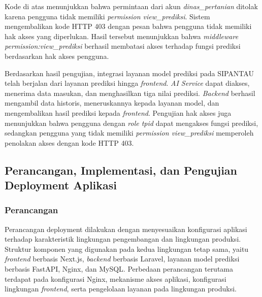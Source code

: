 \begin{code}
\end{code}

Kode di atas menunjukkan bahwa permintaan dari akun \textit{dinas\_pertanian} ditolak karena pengguna tidak memiliki \textit{permission view\_prediksi}. Sistem mengembalikan kode HTTP 403 dengan pesan bahwa pengguna tidak memiliki hak akses yang diperlukan. Hasil tersebut menunjukkan bahwa \textit{middleware permission:\allowbreak view\allowbreak \_prediksi} berhasil membatasi akses terhadap fungsi prediksi berdasarkan hak akses pengguna.

Berdasarkan hasil pengujian, integrasi layanan model prediksi pada SIPANTAU telah berjalan dari layanan prediksi hingga \textit{frontend}. \textit{AI Service} dapat diakses, menerima data masukan, dan menghasilkan tiga nilai prediksi. \textit{Backend} berhasil mengambil data historis, meneruskannya kepada layanan model, dan mengembalikan hasil prediksi kepada \textit{frontend}. Pengujian hak akses juga menunjukkan bahwa pengguna dengan \textit{role tpid} dapat mengakses fungsi prediksi, sedangkan pengguna yang tidak memiliki \textit{permission view\_prediksi} memperoleh penolakan akses dengan kode HTTP 403.

\subsection{Perancangan, Implementasi, dan Pengujian Deployment Aplikasi}

\subsubsection{Perancangan}

Perancangan deployment dilakukan dengan menyesuaikan konfigurasi aplikasi terhadap karakteristik lingkungan pengembangan dan lingkungan produksi. Struktur komponen yang digunakan pada kedua lingkungan tetap sama, yaitu \textit{frontend} berbasis Next.js, \textit{backend} berbasis Laravel, layanan model prediksi berbasis FastAPI, Nginx, dan MySQL. Perbedaan perancangan terutama terdapat pada konfigurasi Nginx, mekanisme akses aplikasi, konfigurasi lingkungan \textit{frontend}, serta pengelolaan layanan pada lingkungan produksi.

